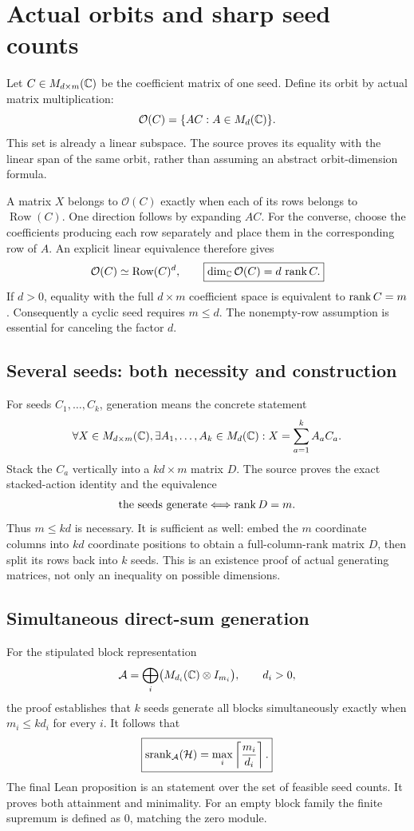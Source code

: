 \section{Actual orbits and sharp seed counts}\label{supp3:section:001}
Let $C\in M_{d\times m}(\C)$ be the coefficient matrix of one seed. Define its orbit by actual matrix multiplication:
\[
\mathcal O(C)=\{AC:A\in M_d(\C)\}.
\]
This set is already a linear subspace. The source proves its equality with the linear span of the same orbit, rather than assuming an abstract orbit-dimension formula.

A matrix $X$ belongs to $\mathcal O(C)$ exactly when each of its rows belongs to $\operatorname{Row}(C)$. One direction follows by expanding $AC$. For the converse, choose the coefficients producing each row separately and place them in the corresponding row of $A$. An explicit linear equivalence therefore gives
\[
\mathcal O(C)\simeq \operatorname{Row}(C)^d,
\qquad
\boxed{\dim_\C\mathcal O(C)=d\,\rank C.}
\]
If $d>0$, equality with the full $d\times m$ coefficient space is equivalent to $\operatorname{rank} C=m$. Consequently a cyclic seed requires $m\le d$. The nonempty-row assumption is essential for canceling the factor $d$.

\subsection{Several seeds: both necessity and construction}
For seeds $C_1,\ldots,C_k$, generation means the concrete statement
\[
\forall X\in M_{d\times m}(\C),\quad
\exists A_1,\ldots,A_k\in M_d(\C):\quad
X=\sum_{a=1}^k A_aC_a.
\]
Stack the $C_a$ vertically into a $kd\times m$ matrix $D$. The source proves the exact stacked-action identity and the equivalence
\[
\text{the seeds generate}\Longleftrightarrow\operatorname{rank} D=m.
\]
Thus $m\le kd$ is necessary. It is sufficient as well: embed the $m$ coordinate columns into $kd$ coordinate positions to obtain a full-column-rank matrix $D$, then split its rows back into $k$ seeds. This is an existence proof of actual generating matrices, not only an inequality on possible dimensions.

\subsection{Simultaneous direct-sum generation}
For the stipulated block representation
\[
\mathcal A=\bigoplus_i\bigl(M_{d_i}(\C)\otimes I_{m_i}\bigr),\qquad d_i>0,
\]
the proof establishes that $k$ seeds generate all blocks simultaneously exactly when $m_i\le kd_i$ for every $i$. It follows that
\[
\boxed{\srank_{\mathcal A}(\mathcal H)=\max_i\left\lceil\frac{m_i}{d_i}\right\rceil.}
\]
The final Lean proposition is an  statement over the set of feasible seed counts. It proves both attainment and minimality. For an empty block family the finite supremum is defined as $0$, matching the zero module.





